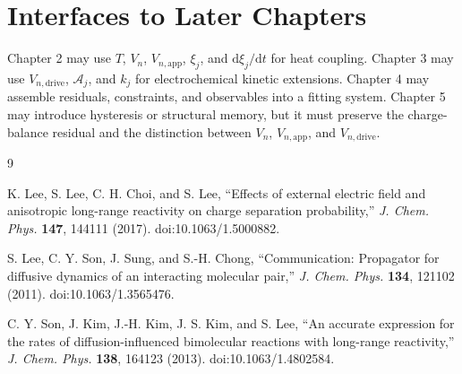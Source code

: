\documentclass[11pt,a4paper]{article}
\newcommand{\dd}{\mathrm{d}}
\newcommand{\app}{\mathrm{app}}
\newcommand{\drive}{\mathrm{drive}}
\begin{document}
\section{Interfaces to Later Chapters}

Chapter 2 may use \(T\), \(V_n\), \(V_{n,\app}\), \(\xi_j\), and
\(\dd\xi_j/\dd t\) for heat coupling.  Chapter 3 may use \(V_{n,\drive}\),
\(\mathcal A_j\), and \(k_j\) for electrochemical kinetic extensions.  Chapter
4 may assemble residuals, constraints, and observables into a fitting system.
Chapter 5 may introduce hysteresis or structural memory, but it must preserve
the charge-balance residual and the distinction between \(V_n\), \(V_{n,\app}\),
and \(V_{n,\drive}\).

\begin{thebibliography}{9}

K. Lee, S. Lee, C. H. Choi, and S. Lee,
``Effects of external electric field and anisotropic long-range reactivity on
charge separation probability,''
\textit{J. Chem. Phys.} \textbf{147}, 144111 (2017).
doi:10.1063/1.5000882.

S. Lee, C. Y. Son, J. Sung, and S.-H. Chong,
``Communication: Propagator for diffusive dynamics of an interacting molecular
pair,''
\textit{J. Chem. Phys.} \textbf{134}, 121102 (2011).
doi:10.1063/1.3565476.

C. Y. Son, J. Kim, J.-H. Kim, J. S. Kim, and S. Lee,
``An accurate expression for the rates of diffusion-influenced bimolecular
reactions with long-range reactivity,''
\textit{J. Chem. Phys.} \textbf{138}, 164123 (2013).
doi:10.1063/1.4802584.

\end{thebibliography}
\end{document}
